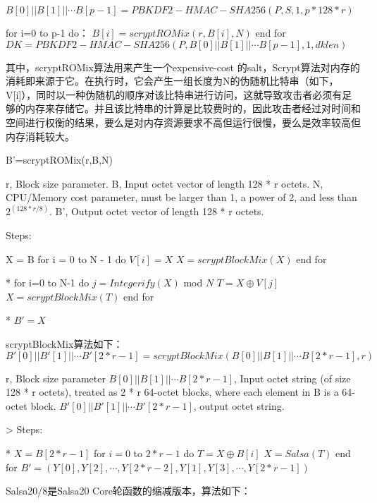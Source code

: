 $B[0]||B[1]||\cdots B[p-1]=PBKDF2-HMAC-SHA256(P,S,1,p*128*r)$

for i=0 to p-1 do：  
$B[i]= scryptROMix(r,B[i],N) $   
end for  
$DK=PBKDF2-HMAC-SHA256(P,B[0]||B[1]||\cdots B[p-1],1,dklen)$

其中，scryptROMix算法用来产生一个expensive-cost 的salt，Scrypt算法对内存的消耗即来源于它。在执行时，它会产生一组长度为N的伪随机比特串（如下，V[i]），同时以一种伪随机的顺序对该比特串进行访问，这就导致攻击者必须有足够的内存来存储它。并且该比特串的计算是比较费时的，因此攻击者经过对时间和空间进行权衡的结果，要么是对内存资源要求不高但运行很慢，要么是效率较高但内存消耗较大。

B'=scryptROMix(r,B,N)

r, Block size parameter.
B, Input octet vector of length 128 * r octets.
N, CPU/Memory cost parameter, must be larger than 1, a power of 2, and less than $2^(128 * r / 8)$.
B', Output octet vector of length 128 * r octets.
 
Steps:

X = B
for i = 0 to N - 1 do  
   $V[i]=X$  
   $X=scryptBlockMix(X)$  
 end for   
 
 * for i=0 to N-1 do    
 $j=Integerify(X)$ mod $N$  
 $T=X \oplus V[j]$  
 $X=scryptBlockMix(T)$  
 end for
 
 * $B'=X$

scryptBlockMix算法如下：
 $B'[0]||B'[1]||\cdots B'[2*r-1]=scryptBlockMix(B[0]||B[1]||\cdots B[2*r-1],r)$

 r, Block size parameter
 $B[0]||B[1]||\cdots B[2*r-1]$, Input octet string (of size 128 * r octets), treated as 2 * r 64-octet blocks, where each element in B is a 64-octet block.
 $B'[0]||B'[1]||\cdots B'[2*r-1]$, output octet string.

> Steps:

* $X = B[2*r-1]$
 for $i = 0$ to $2*r - 1$ do    
$T=X \oplus B[i]$  
$X=Salsa(T)$  
end for   
$B'=(Y[0],Y[2],\cdots,Y[2*r-2],
Y[1],Y[3],\cdots, Y[2*r-1])$

Salsa20/8是Salsa20 Core轮函数的缩减版本，算法如下：


